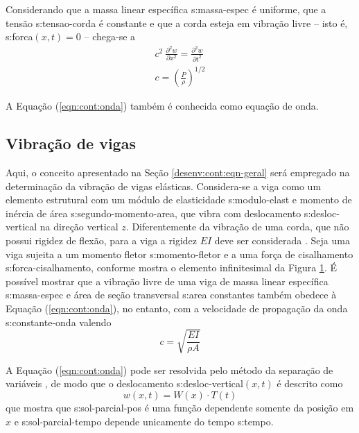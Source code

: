 \documentclass[12pt,openright,oneside,a4paper,
	chapter=TITLE,section=TITLE,
	english,brazil]{abntex2}
\begin{document}
	Considerando que a massa linear específica \gls{s:massa-espec} é uniforme, que a tensão \gls{s:tensao-corda} é constante e que a corda esteja em vibração livre -- isto é, \gls{s:forca}$(x,t) = 0$ -- chega-se a \cite{rao:2008}
	\begin{align}
		\mathit{c}^2\:\frac{\partial^2 w}{\partial x^2}=\frac{\partial^2 w}{\partial t^2} \label{eqn:cont:onda}\\
		\mathit{c} = \left(\frac{P}{\rho}\right)^{1/2}
	\end{align}
	
	A Equação (\ref{eqn:cont:onda}) também é conhecida como equação de onda. 
	
	\subsection{Vibração de vigas} \label{sec:vigas}
	Aqui, o conceito apresentado na Seção \ref{desenv:cont:eqn-geral} será empregado na determinação da vibração de vigas elásticas. Considera-se a viga como um elemento estrutural com um módulo de elasticidade \gls{s:modulo-elast} e momento de inércia de área \gls{s:segundo-momento-area}, que vibra com deslocamento \gls{s:desloc-vertical} na direção vertical $z$. Diferentemente da vibração de uma corda, que não possui rigidez de flexão, para a viga a rigidez $EI$ deve ser considerada \cite{timoshenko:1974}. Seja uma viga sujeita a um momento fletor \gls{s:momento-fletor} e a uma força de cisalhamento \gls{s:forca-cisalhamento}, conforme mostra o elemento infinitesimal da Figura \ref{fig:elemento-viga}. É possível mostrar que a vibração livre de uma viga de massa linear específica \gls{s:massa-espec} e área de seção transversal \gls{s:area} constantes também obedece à Equação (\ref{eqn:cont:onda}), no entanto, com a velocidade de propagação da onda \gls{s:constante-onda} valendo \cite{rao:2008}
	\begin{equation}
		\mathit{c} = \sqrt{\frac{EI}{\rho A}}
	\end{equation}		
	\begin{figure}[b]
		\label{fig:elemento-viga}
	\end{figure}

	A Equação (\ref{eqn:cont:onda}) pode ser resolvida pelo método da separação de variáveis \cite{clark:1972}, de modo que o deslocamento \gls{s:desloc-vertical}$(x,t)$ é descrito como
	\begin{equation} \label{eqn:cont:sep-variaveis}
		w(x,t) = W(x)\cdot T(t)
	\end{equation}
	que mostra que \gls{s:sol-parcial-pos} é uma função dependente somente da posição em $x$ e \gls{s:sol-parcial-tempo} depende unicamente do tempo \gls{s:tempo}.
	
\end{document}
